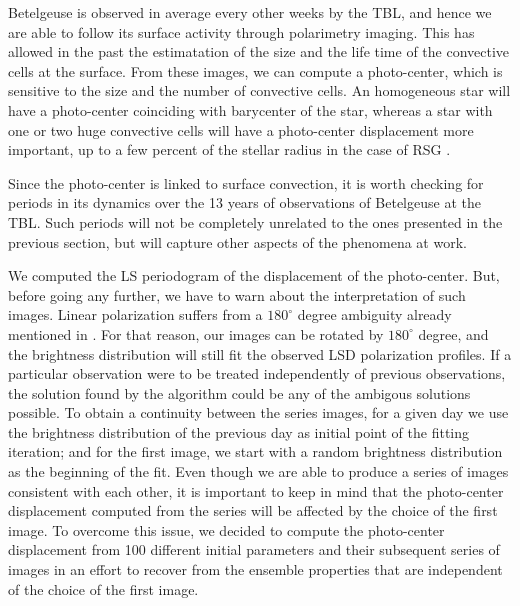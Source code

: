 \documentclass{aa}
\begin{document}
Betelgeuse is observed in average every other weeks by the TBL, and hence
we are able to follow its surface activity through polarimetry imaging. This has  allowed in the past the estimatation of  the size and the
 life time of the convective cells
at the surface. From these images, we can compute a photo-center, which is sensitive to the size and the number of convective cells. 
An homogeneous star will have a photo-center coinciding with barycenter of the star, whereas a star with one or two huge convective cells will have a
photo-center displacement more important, up to a few percent of the stellar radius in the case of RSG \citep{chiavassa_probing_2022}. 

Since the photo-center is linked to surface convection, it is worth checking for periods in its 
dynamics over the 13 years of observations of Betelgeuse at the TBL. Such periods will not 
be completely unrelated to the ones presented in the previous section, but will capture 
other aspects of the phenomena at work.

We computed the LS periodogram of the displacement of the photo-center. But, before going any further, we have to warn
 about the interpretation of such images. 
Linear polarization suffers from a $180 ^\circ$ degree ambiguity already mentioned in \cite{auriere_discovery_2016}. For that reason, our images 
can be 
rotated by $180^\circ$ degree, and the brightness distribution will still fit the observed LSD polarization profiles. 
If a particular observation were to be treated independently of previous observations, the solution found by 
the algorithm could be any of the ambigous solutions possible. To obtain a continuity 
between the series images, 
for a given day we use the brightness distribution of the previous day as initial point 
of the  fitting iteration; and for the first image, we start with a 
random brightness distribution as the beginning of the fit. 
Even though we are able to produce a series of images  consistent with each other, it is important 
to keep in mind that the photo-center displacement computed from the series 
will be affected by the choice of the first image. 
To overcome this issue, we decided to compute
the photo-center displacement from 100 different initial parameters and their subsequent series 
of images in an effort to recover from the ensemble
properties that are independent of the choice of the first image. 
\end{document}
